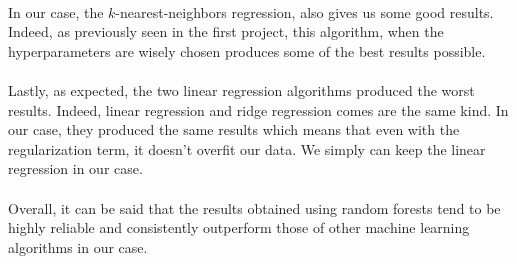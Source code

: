 \paragraph{}
In our case, the $k$-nearest-neighbors regression, also gives us some good results. Indeed, as previously seen in the first project, this algorithm, when the hyperparameters are wisely chosen produces some of the best results possible.
\paragraph{}
Lastly, as expected, the two linear regression algorithms produced the worst results. Indeed, linear regression and ridge regression comes are the same kind. In our case, they produced the same results which means that even with the regularization term, it doesn't overfit our data. We simply can keep the linear regression in our case.
\paragraph{}
Overall, it can be said that the results obtained using random forests tend to be highly reliable and consistently outperform those of other machine learning algorithms in our case.
